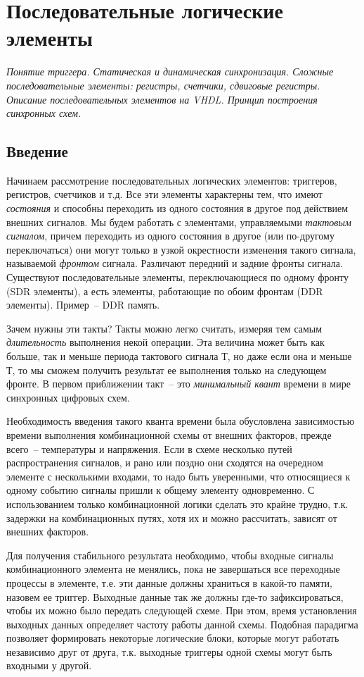 \chapter{Последовательные логические элементы}

\emph{Понятие триггера. Статическая и динамическая синхронизация. Сложные последовательные элементы: регистры, счетчики, сдвиговые регистры. Описание последовательных элементов на VHDL. Принцип построения синхронных схем.}

\section{Введение}

Начинаем рассмотрение последовательных логических элементов: триггеров, регистров, счетчиков и т.д. Все эти элементы характерны тем, что имеют \emph{состояния} и способны переходить из одного состояния в другое под действием внешних сигналов. Мы будем работать с элементами, управляемыми \emph{тактовым сигналом}, причем переходить из одного состояния в другое (или по-другому переключаться) они могут только в узкой окрестности изменения такого сигнала, называемой \emph{фронтом} сигнала. Различают передний и задние фронты сигнала. Существуют последовательные элементы, переключающиеся по одному фронту (SDR элементы), а есть элементы, работающие по обоим фронтам (DDR элементы). Пример~-- DDR память. 

Зачем нужны эти такты? Такты можно легко считать, измеряя тем самым \emph{длительность} выполнения некой операции. Эта величина может быть как больше, так и меньше периода тактового сигнала $Т$, но даже если она и меньше $Т$, то мы сможем получить результат ее выполнения только на следующем фронте. В первом приближении такт~-- это \emph{минимальный квант} времени в мире синхронных цифровых схем.

Необходимость введения такого кванта времени была обусловлена зависимостью времени выполнения комбинационной схемы от внешних факторов, прежде всего~-- температуры и напряжения. Если в схеме несколько путей распространения сигналов, и рано или поздно они сходятся на очередном элементе с несколькими входами, то надо быть уверенными, что относящиеся к одному событию сигналы пришли к общему элементу одновременно. С использованием только комбинационной логики сделать это крайне трудно, т.к. задержки на комбинационных путях, хотя их и можно рассчитать, зависят от внешних факторов.

Для получения стабильного результата необходимо, чтобы входные сигналы комбинационного элемента не менялись, пока не завершаться все переходные процессы в элементе, т.е. эти данные должны храниться в какой-то памяти, назовем ее триггер. Выходные данные так же должны где-то зафиксироваться, чтобы их можно было передать следующей схеме. При этом, время установления выходных данных определяет частоту работы данной схемы. Подобная парадигма позволяет формировать некоторые логические блоки, которые могут работать независимо друг от друга, т.к. выходные триггеры одной схемы могут быть входными у другой.

